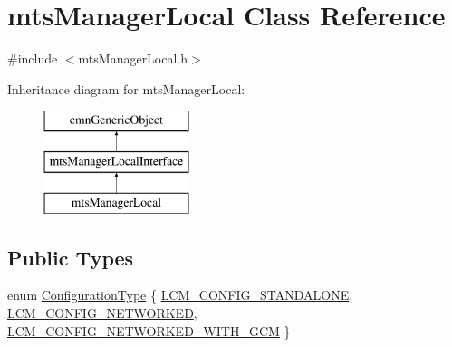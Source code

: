 \hypertarget{classmts_manager_local}{}\section{mts\+Manager\+Local Class Reference}
\label{classmts_manager_local}


{\ttfamily \#include $<$mts\+Manager\+Local.\+h$>$}

Inheritance diagram for mts\+Manager\+Local\+:\begin{figure}[H]
\begin{center}
\leavevmode
\includegraphics[height=3.000000cm]{d7/de0/classmts_manager_local}
\end{center}
\end{figure}
\subsection*{Public Types}
\begin{DoxyCompactItemize}
\item 
enum \hyperlink{classmts_manager_local_ade8a34bedd1d420d29c591711913046a}{Configuration\+Type} \{ \hyperlink{classmts_manager_local_ade8a34bedd1d420d29c591711913046aa4e71c12d636d0dbb6afb75898bf407bd}{L\+C\+M\+\_\+\+C\+O\+N\+F\+I\+G\+\_\+\+S\+T\+A\+N\+D\+A\+L\+O\+N\+E}, 
\hyperlink{classmts_manager_local_ade8a34bedd1d420d29c591711913046aa3e334852cf7d639a3137f3d783f457c4}{L\+C\+M\+\_\+\+C\+O\+N\+F\+I\+G\+\_\+\+N\+E\+T\+W\+O\+R\+K\+E\+D}, 
\hyperlink{classmts_manager_local_ade8a34bedd1d420d29c591711913046aa3dca58dd8da73f899de5acd8d3e70f26}{L\+C\+M\+\_\+\+C\+O\+N\+F\+I\+G\+\_\+\+N\+E\+T\+W\+O\+R\+K\+E\+D\+\_\+\+W\+I\+T\+H\+\_\+\+G\+C\+M}
 \}
\end{DoxyCompactItemize}
